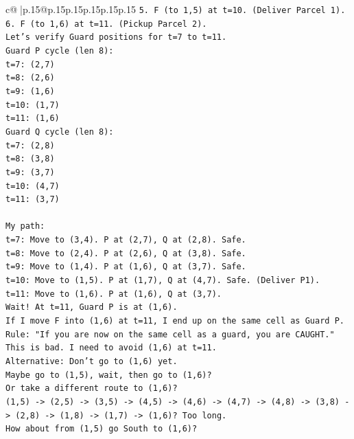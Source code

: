 \documentclass{article}
\begin{document}
{\begin{supertabular}{c@{$\;$}|p{.15\linewidth}@{}p{.15\linewidth}p{.15\linewidth}p{.15\linewidth}p{.15\linewidth}p{.15\linewidth}}
{{{\texttt{5. F (to 1,5) at t=10. (Deliver Parcel 1).} \\
\texttt{6. F (to 1,6) at t=11. (Pickup Parcel 2).} \\
\texttt{Let's verify Guard positions for t=7 to t=11.} \\
\texttt{Guard P cycle (len 8):} \\
\texttt{t=7: (2,7)} \\
\texttt{t=8: (2,6)} \\
\texttt{t=9: (1,6)} \\
\texttt{t=10: (1,7)} \\
\texttt{t=11: (1,6)} \\
\texttt{Guard Q cycle (len 8):} \\
\texttt{t=7: (2,8)} \\
\texttt{t=8: (3,8)} \\
\texttt{t=9: (3,7)} \\
\texttt{t=10: (4,7)} \\
\texttt{t=11: (3,7)} \\
\\ 
\texttt{My path:} \\
\texttt{t=7: Move to (3,4). P at (2,7), Q at (2,8). Safe.} \\
\texttt{t=8: Move to (2,4). P at (2,6), Q at (3,8). Safe.} \\
\texttt{t=9: Move to (1,4). P at (1,6), Q at (3,7). Safe.} \\
\texttt{t=10: Move to (1,5). P at (1,7), Q at (4,7). Safe. (Deliver P1).} \\
\texttt{t=11: Move to (1,6). P at (1,6), Q at (3,7).} \\
\texttt{Wait! At t=11, Guard P is at (1,6).} \\
\texttt{If I move F into (1,6) at t=11, I end up on the same cell as Guard P.} \\
\texttt{Rule: "If you are now on the same cell as a guard, you are CAUGHT."} \\
\texttt{This is bad. I need to avoid (1,6) at t=11.} \\
\texttt{Alternative: Don't go to (1,6) yet.} \\
\texttt{Maybe go to (1,5), wait, then go to (1,6)?} \\
\texttt{Or take a different route to (1,6)?} \\
\texttt{(1,5) {-}> (2,5) {-}> (3,5) {-}> (4,5) {-}> (4,6) {-}> (4,7) {-}> (4,8) {-}> (3,8) {-}> (2,8) {-}> (1,8) {-}> (1,7) {-}> (1,6)? Too long.} \\
\texttt{How about from (1,5) go South to (1,6)?} \\
}}}
\end{supertabular}}
\end{document}
